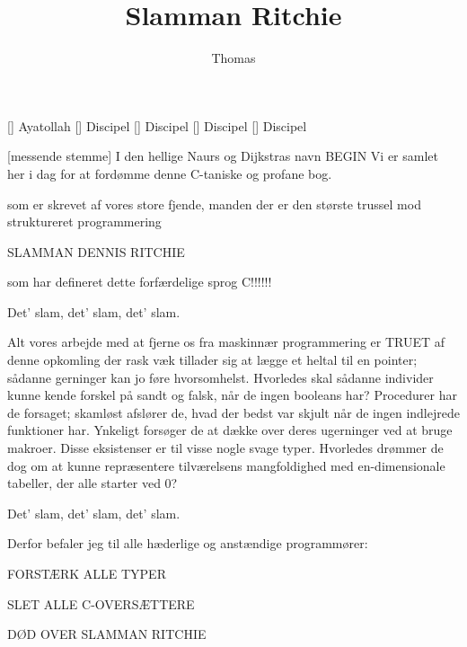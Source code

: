 \documentclass[a4paper,11pt]{article}
\title{Slamman Ritchie}
\author{Thomas}
\begin{document}
\maketitle

\begin{roles}
  [] Ayatollah
  [] Discipel
  [] Discipel
  [] Discipel
  [] Discipel
\end{roles}

\begin{sketch}

  [messende stemme] I den hellige Naurs og Dijkstras navn BEGIN
   Vi er samlet her i dag for at
  fordømme denne C-taniske og profane bog.


  som er skrevet af vores store fjende, manden der er den største trussel mod struktureret programmering

  SLAMMAN DENNIS RITCHIE

  som har defineret dette forfærdelige sprog C!!!!!!

   Det' slam, det' slam, det' slam.

   Alt vores arbejde med at fjerne os fra maskinnær
  programmering er TRUET af denne opkomling der rask væk tillader sig
  at lægge et heltal til en pointer; sådanne gerninger kan jo føre
  hvorsomhelst.  Hvorledes skal sådanne individer kunne kende forskel
  på sandt og falsk, når de ingen booleans har?  Procedurer har de
  forsaget; skamløst afslører de, hvad der bedst var skjult når de
  ingen indlejrede funktioner har.  Ynkeligt forsøger de at dække over
  deres ugerninger ved at bruge makroer.  Disse eksistenser er til
  visse nogle svage typer.  Hvorledes drømmer de dog om at kunne
  repræsentere tilværelsens mangfoldighed med en-dimensionale
  tabeller, der alle starter ved 0?

    Det' slam, det' slam, det' slam.

   Derfor befaler jeg til alle hæderlige og anstændige programmører:

  FORSTÆRK ALLE TYPER

  SLET ALLE C-OVERSÆTTERE

  DØD OVER SLAMMAN RITCHIE

\end{sketch}
\end{document}

